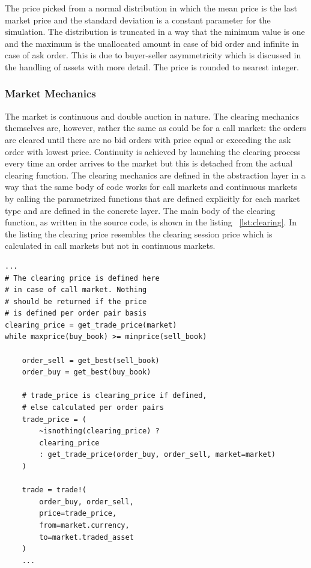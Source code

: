 The price picked from a normal distribution in which the
mean price is the last market price and the standard
deviation is a constant parameter for the simulation.
The distribution is truncated in a way that the minimum
value is one and the maximum is the unallocated amount
in case of bid order and infinite in case of ask order.
This is due to buyer-seller asymmetricity which is discussed
in the handling of assets with more detail. The price
is rounded to nearest integer.





\subsubsection{Market Mechanics}
The market is continuous and double auction in nature.
The clearing mechanics themselves are, however, 
rather the same as could be for a call market: 
the orders are cleared until there
are no bid orders with price equal or exceeding the
ask order with lowest price. 
Continuity is achieved by launching the clearing process
every time an order arrives to the market but this is
detached from the actual clearing function. 
The clearing mechanics are defined in 
the abstraction layer in a way that the same body
of code works for call markets and continuous markets
by calling the parametrized functions that are 
defined explicitly for each market type and are defined
in the concrete layer. The main body of the clearing function, 
as written in the source code, is shown in the listing ~\ref{lst:clearing}.
In the listing the clearing price resembles the clearing
session price which is calculated in call markets but not in
continuous markets.


\begin{lstlisting}[caption={Clearing process},label={lst:clearing}]
...
# The clearing price is defined here
# in case of call market. Nothing
# should be returned if the price
# is defined per order pair basis
clearing_price = get_trade_price(market)
while maxprice(buy_book) >= minprice(sell_book)

    order_sell = get_best(sell_book)
    order_buy = get_best(buy_book)
    
    # trade_price is clearing_price if defined,
    # else calculated per order pairs
    trade_price = (
        ~isnothing(clearing_price) ? 
        clearing_price
        : get_trade_price(order_buy, order_sell, market=market)
    )

    trade = trade!(
        order_buy, order_sell, 
        price=trade_price, 
        from=market.currency, 
        to=market.traded_asset
    )
    ...
\end{lstlisting}

